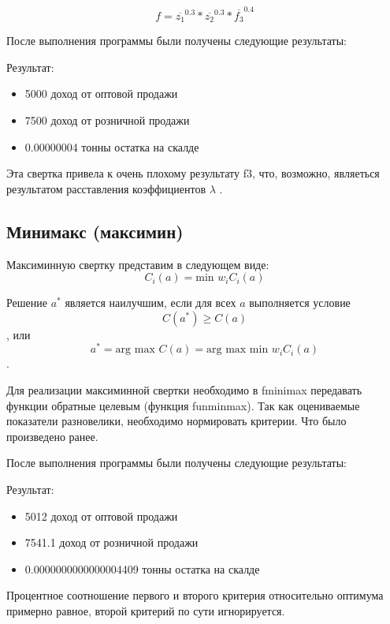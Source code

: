 \documentclass[14pt,a4paper,report]{report}
\begin{document}
\begin{equation}
f = \overline{z_1}^{0.3}*\overline{z_2}^{0.3}*\overline{f_3}^{0.4}
\end{equation}



После выполнения программы были получены следующие результаты:



Результат:
\begin{itemize}
\item 5000 доход от оптовой продажи
\item 7500 доход от розничной продажи
\item 0.00000004 тонны остатка на скалде
\end{itemize}

Эта свертка привела к очень плохому результату f3, что, возможно, являеться результатом расставления коэффициентов $\lambda$ .





\subsection{Минимакс (максимин)}
Максиминную свертку представим в следующем виде: $$ C_i(a)= \text{min } w_i C_i(a) $$

Решение $a^*$ является наилучшим, если для всех $a$ выполняется условие $$C(a^*) \geq C(a) $$, или $$ a^* = \text{arg max } C(a) = \text{arg max min } w_i C_i (a) $$ .

Для реализации максиминной свертки необходимо в fminimax передавать функции обратные целевым (функция funminmax). Так как оцениваемые показатели разновелики, необходимо нормировать критерии. Что было произведено ранее.




После выполнения программы были получены следующие результаты:



Результат:
\begin{itemize}
\item 5012 доход от оптовой продажи
\item 7541.1 доход от розничной продажи
\item 0.0000000000000004409 тонны остатка на скалде
\end{itemize}

Процентное соотношение первого и второго критерия относительно оптимума примерно равное, второй критерий по сути игнорируется.
\end{document}
